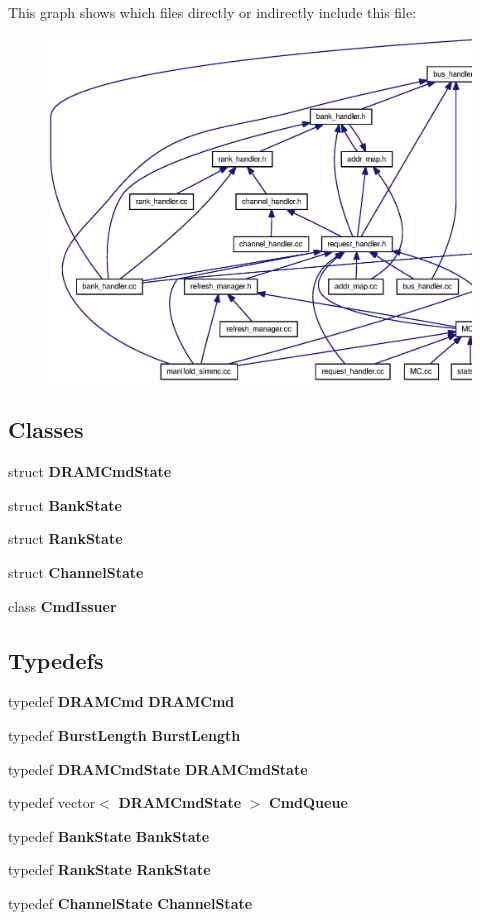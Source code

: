 This graph shows which files directly or indirectly include this file:\nopagebreak
\begin{figure}[H]
\begin{center}
\leavevmode
\includegraphics[width=420pt]{cmd__issuer_8h__dep__incl}
\end{center}
\end{figure}
\subsection*{Classes}
\begin{CompactItemize}
\item 
struct {\bf DRAMCmdState}
\item 
struct {\bf BankState}
\item 
struct {\bf RankState}
\item 
struct {\bf ChannelState}
\item 
class {\bf CmdIssuer}
\end{CompactItemize}
\subsection*{Typedefs}
\begin{CompactItemize}
\item 
typedef {\bf DRAMCmd} {\bf DRAMCmd}
\item 
typedef {\bf BurstLength} {\bf BurstLength}
\item 
typedef {\bf DRAMCmdState} {\bf DRAMCmdState}
\item 
typedef vector$<$ {\bf DRAMCmdState} $>$ {\bf CmdQueue}
\item 
typedef {\bf BankState} {\bf BankState}
\item 
typedef {\bf RankState} {\bf RankState}
\item 
typedef {\bf ChannelState} {\bf ChannelState}
\end{CompactItemize}
